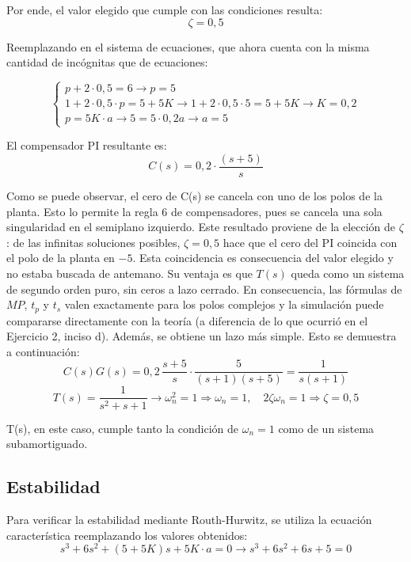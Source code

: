 \documentclass[10pt]{article}
\begin{document}
Por ende, el valor elegido que cumple con las condiciones resulta:
\begin{equation}
    \boxed{\zeta = 0,5}
\end{equation}

Reemplazando en el sistema de ecuaciones, que ahora cuenta con la misma cantidad de incógnitas que de ecuaciones:

\begin{equation}
    \begin{cases}
    p+2\cdot 0,5 = 6 \rightarrow p = 5 \\
    1+ 2\cdot 0,5 \cdot p = 5 + 5K \rightarrow 1+ 2\cdot 0,5 \cdot 5 = 5 + 5K \rightarrow K = 0,2\\
    p = 5K\cdot a \rightarrow 5 = 5\cdot 0,2 a \rightarrow a = 5
    \end{cases}
\end{equation}

El compensador PI resultante es:
\[
C(s) = 0,2 \cdot \frac{(s+5)}{s}
\]

Como se puede observar, el cero de C(s) se cancela con uno de los polos de la planta. Esto lo permite la regla 6 de compensadores, pues se cancela una sola singularidad en el semiplano izquierdo. 
Este resultado proviene de la elección de $\zeta$: de las infinitas soluciones posibles, $\zeta = 0{,}5$ hace que el cero del PI coincida con el polo de la planta en $-5$. 
Esta coincidencia es consecuencia del valor elegido y no estaba buscada de antemano. Su ventaja es que $T(s)$ queda como un sistema de segundo orden puro, sin ceros a lazo cerrado. 
En consecuencia, las fórmulas de $MP$, $t_p$ y $t_s$ valen exactamente para los polos complejos y la simulación puede compararse directamente con la teoría (a diferencia de lo que ocurrió en el Ejercicio 2, inciso d). 
Además, se obtiene un lazo más simple. Esto se demuestra a continuación:
\[
C(s)G(s) = 0{,}2\,\frac{s+5}{s}\cdot\frac{5}{(s+1)(s+5)} = \frac{1}{s(s+1)}
\]
\[
T(s) = \frac{1}{s^2 + s + 1} \rightarrow \omega_n^2 = 1 \Rightarrow \omega_n = 1,
\quad 2\zeta\omega_n = 1 \Rightarrow \zeta = 0{,}5
\]

T(s), en este caso, cumple tanto la condición de $\omega_n = 1$ como de un sistema subamortiguado.

\subsection*{Estabilidad}

Para verificar la estabilidad mediante Routh-Hurwitz, se utiliza la ecuación característica reemplazando los valores obtenidos:
\[
s^3+6s^2+(5+5K)s+5K\cdot a = 0 \rightarrow s^3 + 6s^2 + 6s + 5 = 0
\]
\end{document}
